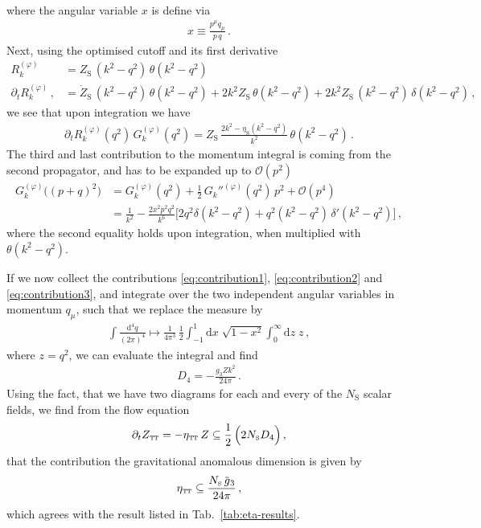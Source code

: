 \documentclass[11pt]{book}
\newcommand{\overbar}[1]{\mkern 1.5mu\overline{\mkern-1.5mu#1\mkern-1.5mu}\mkern 1.5mu}
\newcommand\TTspace{ -1pt }
\newcommand\etaTT{ \eta_{\scriptscriptstyle{\mathrm{T\hspace{\TTspace}T}}} }
\newcommand\ZTT{ Z_{\scriptscriptstyle{\mathrm{T\hspace{\TTspace}T}}} }
\newcommand\etaS{ \eta_{\scriptscriptstyle{\mathrm{S}}} }
\newcommand\ZS{ Z_{\scriptscriptstyle{\mathrm{S}}} }
\newcommand\NS{ N_{\scriptscriptstyle{\mathrm{S}}} }
\numberwithin{equation}{chapter}
\begin{document}
\begin{appendices}
\begin{align}
  \label{eq:contribution1}
\end{align}
where the angular variable $x$ is define via
\begin{align}
  x \equiv  \frac{ p^\mu q_\mu }{ p \, q } \,.
\end{align}
Next, using the optimised cutoff and its first derivative
\begin{align}
  R_k^{(\varphi)}
  &= \ZS \, (k^2 - q^2) \, \theta (k^2 - q^2) \\
  \partial_t R_k^{(\varphi)} \,,
  &= \dot \ZS \, (k^2 - q^2) \, \theta (k^2 - q^2)
  + 2 k^2 \ZS \, \theta (k^2 - q^2)
  + 2 k^2 \ZS \, (k^2 - q^2) \, \delta (k^2 - q^2) \,,
\end{align}
we see that upon integration we have
\begin{align}
  \partial_t R_k^{(\varphi)}(q^2) \,
  G_k^{(\varphi)}(q^2)
  =
  \ZS \, \frac{ 2 k^2 - \etaS ( k^2 - q^2 ) }{ k^2 } \,
  \theta (k^2 - q^2)
  \,.
  \label{eq:contribution2}
\end{align}
The third and last contribution to the momentum integral
is coming from the second propagator, and has to be expanded up
to $\mathcal O(p^2)$
\begin{align}
  G_k^{(\varphi)} \big( (p+q)^2 \big)
  &=
  G_k^{(\varphi)} ( q^2 )
  + \frac{1}{2} \, G_k''^{(\varphi)} ( q^2 ) \, p^2
  + \mathcal O(p^4) \nonumber \\
  &=
  \frac{ 1 }{ k^2 }
  - \frac{ 2 x^2 p^2 q^2 }{ k^6 }
  \big[
    2 q^2 \delta (k^2 - q^2)
    + q^2 (k^2 - q^2) \, \delta' (k^2 - q^2)
  \big] \,,
  \label{eq:contribution3}
\end{align}
where the second equality holds upon integration, when multiplied
with $\theta (k^2 - q^2)$.

If we now collect the contributions
\eqref{eq:contribution1},
\eqref{eq:contribution2} and
\eqref{eq:contribution3},
and integrate over the two independent angular variables in
momentum $q_\mu$, such that we replace the measure by
\begin{align}
  \int \frac{\mathrm{d}^4q}{(2\pi)^4} \mapsto
  \frac{ 1 }{ 4 \pi^3 } \, \frac{1}{2}
  \int_{-1}^{1} \mathrm dx \; \sqrt{ 1-x^2 }
  \int_{0}^{\infty} \mathrm{d}z \; z \,,
\end{align}
where $z = q^2$, we can evaluate the integral and find
\begin{align}
  D_4 =
  - \frac{g_3 Z k^2}{ 24 \pi } \,.
\end{align}
Using the fact, that we have two diagrams for each and every of the
$\NS$ scalar fields, we find from the flow equation
\begin{align}
  \partial_t \ZTT = - \etaTT \, Z \subseteq
  \frac 12 \, \Big( 2 \NS D_4 \Big) \,,
\end{align}
that the contribution the gravitational anomalous dimension
is given by
\begin{align}
  \etaTT \subseteq
  \frac{\NS \, \overbar g_3 }{ 24 \pi } \,,
\end{align}
which agrees with the result listed in Tab.~\ref{tab:eta-results}.




\end{appendices}
\end{document}
